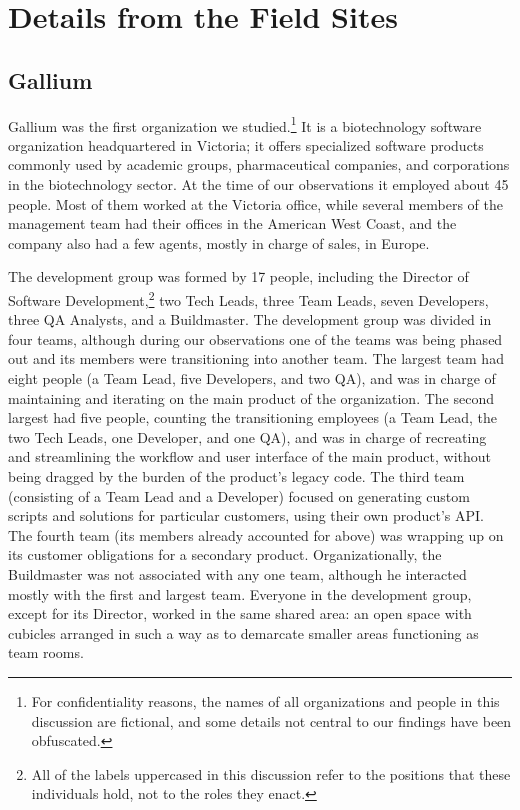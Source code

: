 \documentclass[10pt, conference, compsocconf]{IEEEtran}
\begin{document}

\section{Details from the Field Sites}

\subsection{Gallium}

Gallium was the first organization we studied.\footnote{For confidentiality reasons, the names of all organizations and people in this discussion are fictional, and some details not central to our findings have been obfuscated.} It is a biotechnology software organization headquartered in Victoria; it offers specialized software products commonly used by academic groups, pharmaceutical companies, and corporations in the biotechnology sector. At the time of our observations it employed about 45 people. Most of them worked at the Victoria office, while several members of the management team had their offices in the American West Coast, and the company also had a few agents, mostly in charge of sales, in Europe.

The development group was formed by 17 people, including the Director of Software Development,\footnote{All of the labels uppercased in this discussion refer to the positions that these individuals hold, not to the roles they enact.} two Tech Leads, three Team Leads, seven Developers, three QA Analysts, and a Buildmaster. The development group was divided in four teams, although during our observations one of the teams was being phased out and its members were transitioning into another team. The largest team had eight people (a Team Lead, five Developers, and two QA), and was in charge of maintaining and iterating on the main product of the organization. The second largest had five people, counting the transitioning employees (a Team Lead, the two Tech Leads, one Developer, and one QA), and was in charge of recreating and streamlining the workflow and user interface of the main product, without being dragged by the burden of the product's legacy code. The third team (consisting of a Team Lead and a Developer) focused on generating custom scripts and solutions for particular customers, using their own product's API. The fourth team (its members already accounted for above) was wrapping up on its customer obligations for a secondary product. Organizationally, the Buildmaster was not associated with any one team, although he interacted mostly with the first and largest team. Everyone in the development group, except for its Director, worked in the same shared area: an open space with cubicles arranged in such a way as to demarcate smaller areas functioning as team rooms.
\end{document}
